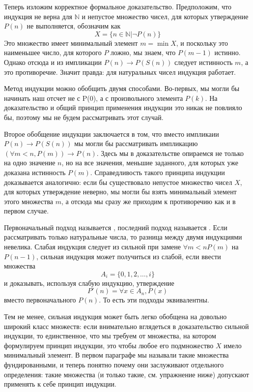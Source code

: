 Теперь изложим корректное формальное доказательство. Предположим, что индукция не верна для $\mathbb{N}$ и непустое множество чисел, для которых утверждение $P(n)$ не выполняется, обозначим как
$$X = \{n\in\mathbb{N}|\neg P(n)\}$$
Это множество имеет минимальный элемент $m=\min X$, и поскольку это наименьшее число, для которого $P$ ложно, мы знаем, что $P(m-1)$ истинно. Однако отсюда и из импликации $P(n)\to P(S(n))$ следует истинность $m$, а это противоречие. Значит правда: для натуральных чисел индукция работает.

Метод индукции можно обобщить двумя способами. Во-первых, мы могли бы начинать наш отсчет не с P(0), а с произвольного элемента $P(k)$. На доказательство и общий принцип применения индукции это никак не повлияло бы, поэтому мы не будем рассматривать этот случай.

Второе обобщение индукции заключается в том, что вместо импликаии $P(n)\to P(S(n))$ мы могли бы рассматривать импликацию $(\forall m<n, P(m))\to P(n)$. Здесь мы в доказательстве опираемся не только на одно значение $n$, но на все значения, меньшие заданного, для которых уже доказана истинность $P(m)$. Справедливость такого принципа индукции доказывается аналогично: если бы существовало непустое множество чисел $X$, для которых утверждение неверно, мы могли бы взять минимальный элемент этого множества $m$, а отсюда мы сразу же приходим к противоречию как и в первом случае.

Первоначальный подход называется , последний подход называется . Если рассматривать только натуральные числа, то разница между двумя индукциями невелика. Слабая индукция следует из сильной при замене $\forall m<n P(m)$ на $P(n-1)$, сильная индукция может получиться из слабой, если ввести множества
$$A_i = \{0, 1, 2, \ldots, i\}$$
и доказывать, используя слабую индукцию, утверждение
$$P'(n) = \forall x \in A_n, P(x)$$
вместо первоначального $P(n)$. То есть эти подходы эквивалентны.

Тем не менее, сильная индукция может быть легко обобщена на довольно широкий класс множеств: если внимательно вглядеться в доказательство сильной индукции, то единственное, что мы требуем от множества, на котором формулируем принцип индукции, это чтобы любое его подмножество $X$ имело минимальный элемент. В первом параграфе мы называли такие множества фундированными, и теперь понятно почему они заслуживают отдельного определения: такие множества (и только такие, см. упражнение ниже) допускают применять к себе принцип индукции.

